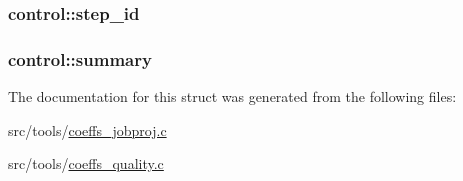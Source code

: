 \subsubsection[{\texorpdfstring{step\+\_\+id}{step_id}}]{ control\+::step\+\_\+id}\hypertarget{structcontrol_a5c60a2ddd48af987e6e6f169f0bce418}{}\label{structcontrol_a5c60a2ddd48af987e6e6f169f0bce418}
\subsubsection[{\texorpdfstring{summary}{summary}}]{ control\+::summary}\hypertarget{structcontrol_a83bc735a6e6d51728d78ba73bcbaf393}{}\label{structcontrol_a83bc735a6e6d51728d78ba73bcbaf393}


The documentation for this struct was generated from the following files\+:\begin{DoxyCompactItemize}
\item 
src/tools/\hyperlink{coeffs__jobproj_8c}{coeffs\+\_\+jobproj.\+c}\item 
src/tools/\hyperlink{coeffs__quality_8c}{coeffs\+\_\+quality.\+c}\end{DoxyCompactItemize}
